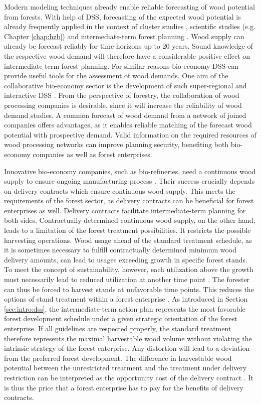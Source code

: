 Modern modeling techniques already enable reliable forecasting of wood potential from forests. With help of DSS, forecasting of the expected wood potential is already frequently applied in the context of cluster studies \citep[e.g.][]{bmel_2016}, scientific studies (e.g. Chapter \ref{chap:hzb}) and intermediate-term forest planning \citep[e.g.][]{bockmann_2004}. Wood supply can already be forecast reliably for time horizons up to 20 years. Sound knowledge of the respective wood demand will therefore have a considerable positive effect on intermediate-term forest planning. For similar reasons bio-economy DSS can provide useful tools for the assessment of wood demands. One aim of the collaborative bio-economy sector is the development of such super-regional and interactive DSS \citep[p. 362]{ollikainen_2014}. From the perspective of forestry, the collaboration of wood processing companies is desirable, since it will increase the reliability of wood demand studies. A common forecast of wood demand from a network of joined companies offers advantages, as it enables reliable matching of the forecast wood potential with prospective demand. Valid information on the required resources of wood processing networks can improve planning security, benefiting both bio-economy companies as well as forest enterprises.

Innovative bio-economy companies, such as bio-refineries, need a continuous wood supply to ensure ongoing manufacturing process \citep[p. 362]{ollikainen_2014}. Their success crucially depends on delivery contracts which ensure continuous wood supply. This meets the requirements of the forest sector, as delivery contracts can be beneficial for forest enterprises as well. Delivery contracts facilitate intermediate-term planning for both sides. Contractually determined continuous wood supply, on the other hand, leads to a limitation of the forest treatment possibilities. It restricts the possible harvesting operations. Wood usage ahead of the standard treatment schedule, as it is sometimes necessary to fulfill contractually determined minimum wood delivery amounts, can lead to usages exceeding growth in specific forest stands. To meet the concept of sustainability, however, each utilization above the growth must necessarily lead to reduced utilization at another time point \citep[p. 67]{mohring_1997}. The forester can thus be forced to harvest stands at unfavorable time points. This reduces the options of stand treatment within a forest enterprise \citep[p. 351-352]{mohring_2010}. As introduced in Section \ref{sec:intro:dss}, the intermediate-term action plan represents the most favorable forest development schedule under a given strategic orientation of the forest enterprise. If all guidelines are respected properly, the standard treatment therefore represents the maximal harvestable wood volume without violating the intrinsic strategy of the forest enterprise. Any distortion will lead to a deviation from the preferred forest development. The difference in harvestable wood potential between the unrestricted treatment and the treatment under delivery restriction can be interpreted as the opportunity cost of the delivery contract \citep[p. 353]{mohring_2010}. It is thus the price that a forest enterprise has to pay for the benefits of delivery contracts.

